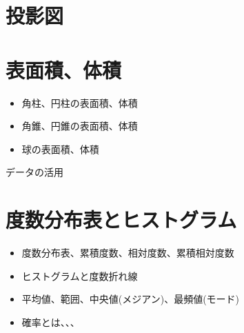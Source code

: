 \documentclass[11pt]{article}
\begin{document}
\section{投影図}

\section{表面積、体積}
\begin{itemize}
\item 角柱、円柱の表面積、体積
\item 角錐、円錐の表面積、体積
\item 球の表面積、体積
\end{itemize}

\newpage

{\LARGE \noindent データの活用}
\section{度数分布表とヒストグラム}
\begin{itemize}
\item 度数分布表、累積度数、相対度数、累積相対度数
\item ヒストグラムと度数折れ線
\item 平均値、範囲、中央値(メジアン)、最頻値(モード)
\item 確率とは、、、
\end{itemize}
\end{document}
